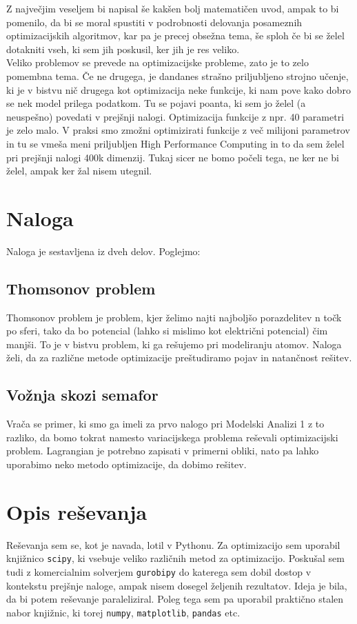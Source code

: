 \documentclass[a4paper]{article}
\begin{document}
Z največjim veseljem bi napisal še kakšen bolj matematičen uvod, ampak to bi pomenilo, da bi 
se moral spustiti v podrobnosti delovanja posameznih optimizacijskih algoritmov, kar pa je
precej obsežna tema, še sploh če bi se želel dotakniti vseh, ki sem jih poskusil, ker jih je
res veliko. \\

Veliko problemov se prevede na optimizacijske probleme, zato je to zelo pomembna tema. Če 
ne drugega, je dandanes strašno priljubljeno strojno učenje, ki je v bistvu nič drugega kot
optimizacija neke funkcije, ki nam pove kako dobro se nek model prilega podatkom. Tu se pojavi 
poanta, ki sem jo želel (a neuspešno) povedati v prejšnji nalogi. Optimizacija funkcije z npr. 40 
parametri je zelo malo. V praksi smo zmožni optimizirati funkcije z več milijoni parametrov in tu
se vmeša meni priljubljen High Performance Computing in to da sem želel pri prejšnji nalogi 400k
dimenzij. Tukaj sicer ne bomo počeli tega, ne ker ne bi želel, ampak ker žal nisem utegnil. \\

\section{Naloga}
Naloga je sestavljena iz dveh delov. Poglejmo:
\subsection{Thomsonov problem}
Thomsonov problem je problem, kjer želimo najti najboljšo porazdelitev n točk po sferi, tako da
bo potencial (lahko si mislimo kot električni potencial) čim manjši. To je v bistvu problem, ki
ga rešujemo pri modeliranju atomov. Naloga želi, da za različne metode optimizacije preštudiramo
pojav in natančnost rešitev. \\

\subsection{Vožnja skozi semafor}
Vrača se primer, ki smo ga imeli za prvo nalogo pri Modelski Analizi 1 z to razliko, da bomo tokrat 
namesto variacijskega problema reševali optimizacijski problem. Lagrangian je potrebno zapisati v 
primerni obliki, nato pa lahko uporabimo neko metodo optimizacije, da dobimo rešitev. \\

\section{Opis reševanja}
Reševanja sem se, kot je navada, lotil v Pythonu. Za optimizacijo sem uporabil knjižnico \texttt{scipy},
ki vsebuje veliko različnih metod za optimizacijo. Poskušal sem tudi z komercialnim solverjem \texttt{gurobipy}
do katerega sem dobil dostop v kontekstu prejšnje naloge, ampak nisem dosegel željenih rezultatov. Ideja
je bila, da bi potem reševanje paraleliziral. Poleg tega sem pa uporabil praktično stalen nabor knjižnic, ki
torej \texttt{numpy}, \texttt{matplotlib}, \texttt{pandas} etc. \\
\end{document}
